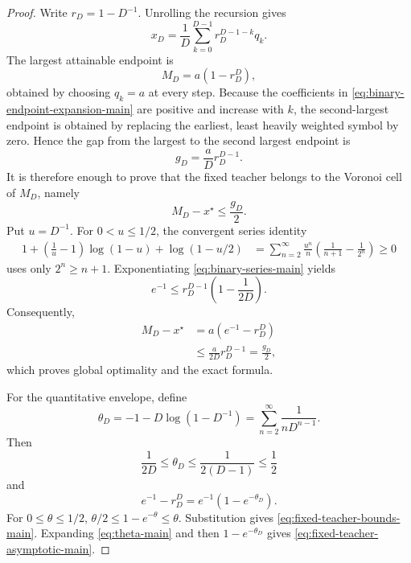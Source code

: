 \documentclass[10pt,a4paper]{amsart}
\begin{document}
\begin{proof}
Write $r_D=1-D^{-1}$.  Unrolling the recursion gives
\begin{equation}
 x_D=\frac1D\sum_{k=0}^{D-1}r_D^{D-1-k}q_k.
 \label{eq:binary-endpoint-expansion-main}
\end{equation}
The largest attainable endpoint is
\begin{equation}
 M_D=a(1-r_D^D),
 \label{eq:binary-largest-main}
\end{equation}
obtained by choosing $q_k=a$ at every step.  Because the coefficients in \eqref{eq:binary-endpoint-expansion-main} are positive and increase with $k$, the second-largest endpoint is obtained by replacing the earliest, least heavily weighted symbol by zero.  Hence the gap from the largest to the second largest endpoint is
\begin{equation}
 g_D=\frac{a}{D}r_D^{D-1}.
 \label{eq:binary-top-gap-main}
\end{equation}
It is therefore enough to prove that the fixed teacher belongs to the Voronoi cell of $M_D$, namely
\begin{equation}
 M_D-x^\star\le \frac{g_D}{2}.
 \label{eq:binary-voronoi-condition-main}
\end{equation}
Put $u=D^{-1}$.  For $0<u\le1/2$, the convergent series identity
\begin{align}
 1+\left(\frac1u-1\right)\log(1-u)+\log(1-u/2)
 &=\sum_{n=2}^{\infty}\frac{u^n}{n}
   \left(\frac1{n+1}-\frac1{2^n}\right)
 \ge0
 \label{eq:binary-series-main}
\end{align}
uses only $2^n\ge n+1$.  Exponentiating \eqref{eq:binary-series-main} yields
\begin{equation}
 e^{-1}\le r_D^{D-1}\left(1-\frac1{2D}\right).
 \label{eq:binary-exponential-ineq-main}
\end{equation}
Consequently,
\begin{align}
 M_D-x^\star
 &=a(e^{-1}-r_D^D) \\
 &\le \frac{a}{2D}r_D^{D-1}
 =\frac{g_D}{2},
 \label{eq:binary-voronoi-proof-main}
\end{align}
which proves global optimality and the exact formula.

For the quantitative envelope, define
\begin{equation}
 \theta_D=-1-D\log(1-D^{-1})
 =\sum_{n=2}^{\infty}\frac1{nD^{n-1}}.
 \label{eq:theta-main}
\end{equation}
Then
\begin{equation}
 \frac1{2D}\le\theta_D\le\frac1{2(D-1)}\le\frac12
 \label{eq:theta-bounds-main}
\end{equation}
and
\begin{equation}
 e^{-1}-r_D^D=e^{-1}(1-e^{-\theta_D}).
 \label{eq:theta-error-main}
\end{equation}
For $0\le\theta\le1/2$, $\theta/2\le1-e^{-\theta}\le\theta$.  Substitution gives \eqref{eq:fixed-teacher-bounds-main}.  Expanding \eqref{eq:theta-main} and then $1-e^{-\theta_D}$ gives \eqref{eq:fixed-teacher-asymptotic-main}.
\end{proof}
\end{document}

